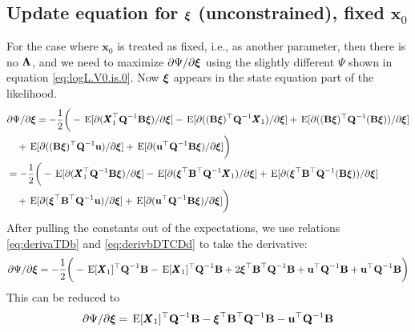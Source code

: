 \documentclass[]{article}
\def\xixi{\mbox{\boldmath $\xi$}}
\def\LAM{\mbox{\boldmath $\Lambda$}}
\def\BB{\mbox{$\mathbf B$}}	\def\bb{\mbox{$\mathbf b$}}
\def\QQ{\mbox{$\mathbf Q$}}	 \def\qq{\mbox{$\mathbf q$}}
\def\XX{\mbox{$\pmb{X}$}}	\def\xx{\mbox{$\pmb{x}$}}
\def\E{\,\textup{\textrm{E}}}
\begin{document}
\subsection{Update equation for $\xixi$ (unconstrained), fixed $\xx_0$}
For the case where $\xx_0$ is treated as fixed, i.e., as another parameter, then there is no $\LAM$, and we need to maximize $\partial\Psi/\partial\xixi$ using the slightly different $\Psi$ shown in equation \ref{eq:logL.V0.is.0}.  Now $\xixi$ appears in the state equation part of the likelihood.
\begin{equation}\label{eq:pi.unconstrained.V0.is.0}
\begin{split}
&\partial\Psi/\partial\xixi = -\frac{1}{2} \bigg(-\E[\partial(\XX_1^\top\QQ^{-1}\BB\xixi)/\partial\xixi] 
 - \E[\partial((\BB\xixi)^\top\QQ^{-1}\XX_1)/\partial\xixi] + \E[\partial((\BB\xixi)^\top\QQ^{-1}(\BB\xixi))/\partial\xixi] \\
&\quad +  \E[\partial((\BB\xixi)^\top\QQ^{-1}\uu)/\partial\xixi] 
+ \E[\partial(\uu^\top\QQ^{-1}\BB\xixi)/\partial\xixi]\bigg)\\
&= -\frac{1}{2} \bigg(-\E[\partial(\XX_1^\top\QQ^{-1}\BB\xixi)/\partial\xixi] 
 - \E[\partial(\xixi^\top\BB^\top\QQ^{-1}\XX_1)/\partial\xixi] 
+ \E[\partial(\xixi^\top\BB^\top\QQ^{-1}(\BB\xixi))/\partial\xixi] \\
&\quad +  \E[\partial(\xixi^\top\BB^\top\QQ^{-1}\uu)/\partial\xixi] 
+ \E[\partial(\uu^\top\QQ^{-1}\BB\xixi)/\partial\xixi]\bigg)
\end{split}
\end{equation}
After pulling the constants out of the expectations, we use relations \eqref{eq:derivaTDb} and \eqref{eq:derivbDTCDd} to take the derivative:
\begin{equation}\label{eq:pi.unconstrained.V0.is.0.2}
\begin{split}
\partial\Psi/\partial\xixi = -\frac{1}{2} \bigg(-\E[\XX_1]^\top\QQ^{-1}\BB - \E[ \XX_1]^\top\QQ^{-1}\BB 
 + 2 \xixi^\top\BB^\top\QQ^{-1}\BB + \uu^\top\QQ^{-1}\BB  +  \uu^\top\QQ^{-1}\BB \bigg) \\
\end{split}
\end{equation}
This can be reduced to
\begin{equation}\label{eq:pi.unconstrained.V0.is.0.3}
\begin{split}
\partial\Psi/\partial\xixi = \E[\XX_1]^\top\QQ^{-1}\BB - \xixi^\top\BB^\top\QQ^{-1}\BB - \uu^\top\QQ^{-1}\BB 
\end{split}
\end{equation}
\end{document}
